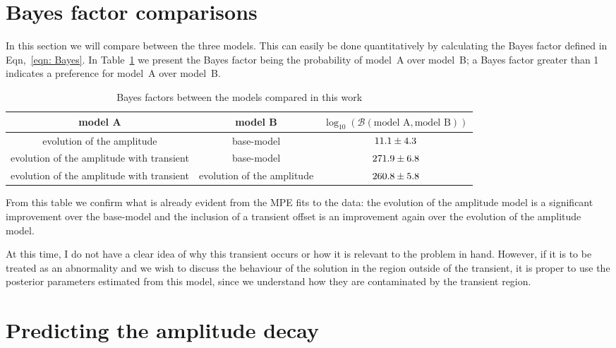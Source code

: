 \documentclass{article}
\begin{document}
\section{Bayes factor comparisons}
In this section we will compare between the three models. This can easily be
done quantitatively by calculating the Bayes factor defined in Eqn,~\eqref{eqn: Bayes}.
In Table~\ref{tab: bayes factors} we present the Bayes factor being the probability
of model~A over model~B; a Bayes factor greater than 1 indicates a preference for
model~A over model~B.
\begin{table}[htb]
\centering
\caption{Bayes factors between the models compared in this work}
\label{tab: bayes factors}
\begin{tabular}{ccc} \hhline{===}
model A & model B & $\log_{10}(\mathcal{B}(\textrm{model A}, \textrm{model B}))$\\ \hline
evolution of the amplitude & base-model &
$ 11.1 \pm
  4.3$\\
evolution of the amplitude with transient & base-model &
$ 271.9 \pm
  6.8$ \\
evolution of the amplitude with transient & evolution of the amplitude &
$ 260.8 \pm
  5.8$
\end{tabular}
\end{table}
From this table we confirm what is already evident from the MPE fits to the
data: the evolution of the amplitude model is a significant improvement over
the base-model and the inclusion of a transient offset is an improvement again
over the evolution of the amplitude model.

At this time, I do not have a clear idea of why this transient occurs or how it
is relevant to the problem in hand. However, if it is to be treated as an
abnormality and we wish to discuss the behaviour of the solution in the region
outside of the transient, it is proper to use the posterior parameters
estimated from this model, since we understand how they are contaminated by the
transient region.

\section{Predicting the amplitude decay}
\label{sec: predictions}
\end{document}
